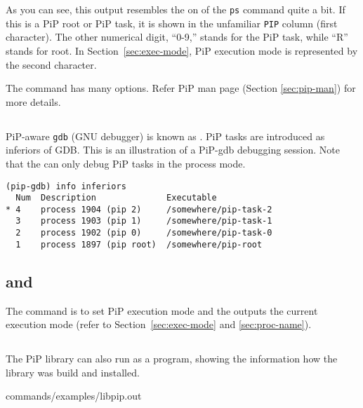 As you can see, this output resembles the on of the {\tt ps} command
quite a bit. If this is a PiP root or PiP task, it is shown in the
unfamiliar {\tt PIP} column (first character). The other numerical
digit, ``0-9,'' stands for the PiP task, while ``R'' stands for
root. In Section~\ref{sec:exec-mode}, PiP execution 
mode is represented by the second character.

The  command has many options. Refer PiP man page
(Section \ref{sec:pip-man}) for more details. 

\subsection{}\label{sec:pip-gdb}

PiP-aware {\tt gdb} (GNU debugger) is known as . PiP
tasks are introduced as inferiors of GDB. This is an illustration of a
PiP-gdb debugging session. Note that the  can only
debug PiP tasks in the process mode.

\begin{lstlisting}[frame=tRBl]
(pip-gdb) info inferiors
  Num  Description              Executable
* 4    process 1904 (pip 2)     /somewhere/pip-task-2
  3    process 1903 (pip 1)     /somewhere/pip-task-1
  2    process 1902 (pip 0)     /somewhere/pip-task-0
  1    process 1897 (pip root)  /somewhere/pip-root
\end{lstlisting}

\subsection{ and }\label{sec:pip-mode}

The  command is to set PiP execution mode and the
 outputs the current execution mode (refer to
Section~\ref{sec:exec-mode} and \ref{sec:proc-name}). 

\subsection{}

The PiP library  can also run as a program, showing the
information how the library was build and installed.


                {commands/examples/libpip.out}
